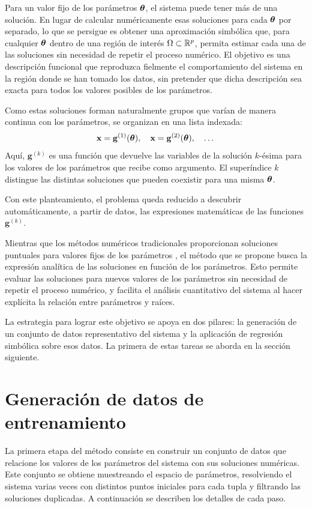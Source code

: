Para un valor fijo de los parámetros \(\boldsymbol{\theta}\), el sistema puede tener más de una solución. En lugar de calcular numéricamente esas soluciones para cada \(\boldsymbol{\theta}\) por separado, lo que se persigue es obtener una aproximación simbólica que, para cualquier \(\boldsymbol{\theta}\) dentro de una región de interés \(\Omega \subset \mathbb{R}^p\), permita estimar cada una de las soluciones sin necesidad de repetir el proceso numérico. El objetivo es una descripción funcional que reproduzca fielmente el comportamiento del sistema en la región donde se han tomado los datos, sin pretender que dicha descripción sea exacta para todos los valores posibles de los parámetros.

Como estas soluciones forman naturalmente grupos que varían de manera continua con los parámetros, se organizan en una lista indexada:
\[
\mathbf{x} = \mathbf{g}^{(1)}(\boldsymbol{\theta}),\quad \mathbf{x} = \mathbf{g}^{(2)}(\boldsymbol{\theta}),\quad \dots
\]
Aquí, \(\mathbf{g}^{(k)}\) es una función que devuelve las variables de la solución \(k\)-ésima para los valores de los parámetros que recibe como argumento. El superíndice \(k\) distingue las distintas soluciones que pueden coexistir para una misma \(\boldsymbol{\theta}\).

Con este planteamiento, el problema queda reducido a descubrir automáticamente, a partir de datos, las expresiones matemáticas de las funciones \(\mathbf{g}^{(k)}\).

Mientras que los métodos numéricos tradicionales proporcionan soluciones puntuales para valores fijos de los parámetros \cite{burden2010numerical}, el método que se propone busca la expresión analítica de las soluciones en función de los parámetros. Esto permite evaluar las soluciones para nuevos valores de los parámetros sin necesidad de repetir el proceso numérico, y facilita el análisis cuantitativo del sistema al hacer explícita la relación entre parámetros y raíces.

La estrategia para lograr este objetivo se apoya en dos pilares: la generación de un conjunto de datos representativo del sistema y la aplicación de regresión simbólica sobre esos datos. La primera de estas tareas se aborda en la sección siguiente.

\section{Generación de datos de entrenamiento}
\label{sec:generacion_datos}

La primera etapa del método consiste en construir un conjunto de datos que relacione los valores de los parámetros del sistema con sus soluciones numéricas. Este conjunto se obtiene muestreando el espacio de parámetros, resolviendo el sistema varias veces con distintos puntos iniciales para cada tupla y filtrando las soluciones duplicadas. A continuación se describen los detalles de cada paso.

